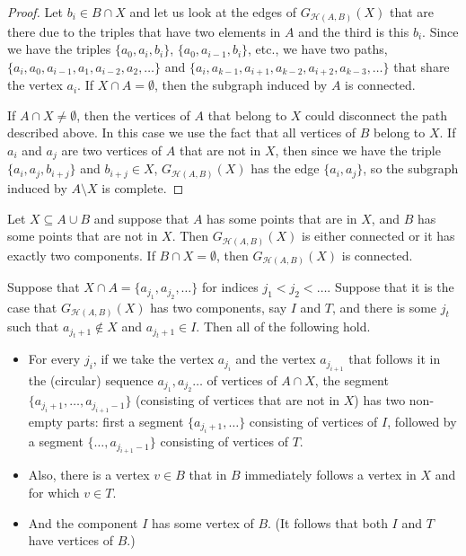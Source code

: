 \documentclass[11pt,a4paper]{article}
\begin{document}
\begin{proof}
 Let $b_i\in B\cap X$ and let us look at the edges of $G_{\mathcal{H}(A,B)}(X)$ that are there due to the triples that have two elements in $A$ and the third is this $b_i$. Since we have the triples $\{a_0,a_i,b_i\}$, $\{a_0,a_{i-1},b_i\}$, etc., we have two paths, $\{a_i,a_0,a_{i-1},a_1,a_{i-2},a_2,\dots\}$ and $\{a_i,a_{k-1},a_{i+1},\allowbreak a_{k-2},a_{i+2},a_{k-3},\dots\}$ that share the vertex $a_i$. If $X\cap A=\emptyset$, then the subgraph induced by $A$ is connected.

If $A\cap X\neq\emptyset$, then the vertices of $A$ that belong to $X$ could disconnect the path described above. In this case we use the fact that all vertices of $B$ belong to $X$. %
If $a_i$ and $a_j$ are two vertices of $A$ that are not in $X$, then since we have the triple $\{a_i,a_j,b_{i+j}\}$ and $b_{i+j}\in X$, $G_{\mathcal{H}(A,B)}(X)$ has the edge $\{a_i,a_j\}$, so the subgraph induced by $A\setminus X$ is complete.
\end{proof}


\begin{lemma}\label{lemma:connectedAB}
 Let $X\subseteq A\cup B$ and suppose that $A$ has some points that are in $X$, and $B$ has some points that are not in $X$. Then $G_{\mathcal{H}(A,B)}(X)$ is either connected or it has exactly two components. If $B\cap X=\emptyset$, then $G_{\mathcal{H}(A,B)}(X)$ is connected.

Suppose that $X\cap A=\{a_{j_1},a_{j_2},\dots\}$ for indices $j_1<j_2<\dots$. Suppose that it is the case that $G_{\mathcal{H}(A,B)}(X)$ has two components, say $I$ and $T$, and there is some $j_t$ such that $a_{j_t +1}\not \in X$ and $a_{j_t +1}\in I$. Then all of the following hold.
    \begin{itemize}
     \item For every $j_i$, if we take the vertex $a_{j_i}$ and the vertex $a_{j_{i+1}}$ that follows it in the (circular) sequence $a_{j_1},a_{j_2}\dots$ of vertices of $A\cap X$, the segment $\{a_{j_i +1},\dots,a_{j_{i+1} -1}\}$ (consisting of vertices that are not in $X$) has two non-empty parts: first a segment $\{a_{j_i +1},\dots \}$ consisting of vertices of $I$, followed by a segment $\{\dots,a_{j_{i+1}-1}\}$ consisting of vertices of $T$.
     \item Also, there is a vertex $v\in B$ that in $B$ immediately follows a vertex in $X$ and for which $v\in T$.
     \item And the component $I$ has some vertex of $B$. (It follows that both $I$ and $T$ have vertices of $B$.)
    \end{itemize}
\end{lemma}
\end{document}
